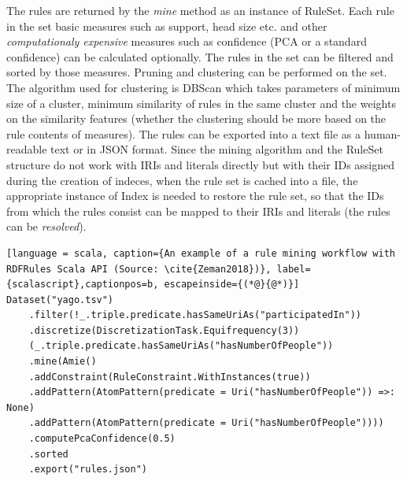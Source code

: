 
The rules are returned by the \textit{mine} method as an instance of RuleSet. Each rule in the set basic measures such as support, head size etc. and other \textit{computationaly expensive} measures such as confidence (PCA or a standard confidence) can be calculated optionally. The rules in the set can be filtered and sorted by those measures. Pruning and clustering can be performed on the set. The algorithm used for clustering is DBScan which takes parameters of minimum size of a cluster, minimum similarity of rules in the same cluster and the weights on the similarity features (whether the clustering should be more based on the rule contents of measures). The rules can be exported into a text file as a human-readable text or in JSON format. Since the mining algorithm and the RuleSet structure do not work with IRIs and literals directly but with their IDs assigned during the creation of indeces, when the rule set is cached into a file, the appropriate instance of Index is needed to restore the rule set, so that the IDs from which the rules consist can be mapped to their IRIs and literals (the rules can be \textit{resolved}).

\begin{lstlisting}[language = scala, caption={An example of a rule mining workflow with RDFRules Scala API (Source: \cite{Zeman2018})}, label={scalascript},captionpos=b, escapeinside={(*@}{@*)}]
Dataset("yago.tsv")
    .filter(!_.triple.predicate.hasSameUriAs("participatedIn"))
    .discretize(DiscretizationTask.Equifrequency(3))
    (_.triple.predicate.hasSameUriAs("hasNumberOfPeople"))
    .mine(Amie()
    .addConstraint(RuleConstraint.WithInstances(true))
    .addPattern(AtomPattern(predicate = Uri("hasNumberOfPeople")) =>: None)
    .addPattern(AtomPattern(predicate = Uri("hasNumberOfPeople"))))
    .computePcaConfidence(0.5)
    .sorted
    .export("rules.json")
\end{lstlisting}
